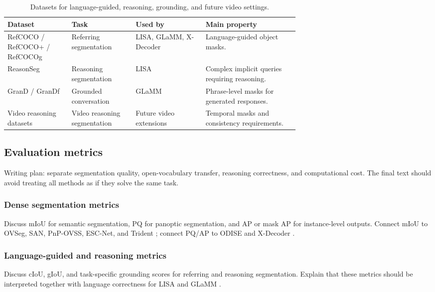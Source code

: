 \begin{table}[t]
\centering
\small
\caption{Datasets for language-guided, reasoning, grounding, and future video settings.}
\label{tab:datasets-grounding}
\begin{tabularx}{\linewidth}{p{0.22\linewidth} p{0.22\linewidth} p{0.24\linewidth} X}
\toprule
Dataset & Task & Used by & Main property \\
\midrule
RefCOCO / RefCOCO+ / RefCOCOg & Referring segmentation & LISA, GLaMM, X-Decoder \citep{lai2024lisa,rasheed2024glamm,zou2023xdecoder} & Language-guided object masks. \\
ReasonSeg & Reasoning segmentation & LISA \citep{lai2024lisa} & Complex implicit queries requiring reasoning. \\
GranD / GranDf & Grounded conversation & GLaMM \citep{rasheed2024glamm} & Phrase-level masks for generated responses. \\
Video reasoning datasets & Video reasoning segmentation & Future video extensions & Temporal masks and consistency requirements. \\
\bottomrule
\end{tabularx}
\end{table}

\subsection{Evaluation metrics}
\label{subsec:evaluation-metrics}
Writing plan: separate segmentation quality, open-vocabulary transfer, reasoning correctness, and computational cost. The final text should avoid treating all methods as if they solve the same task.

\subsubsection{Dense segmentation metrics}
\label{subsubsec:dense-metrics}
Discuss mIoU for semantic segmentation, PQ for panoptic segmentation, and AP or mask AP for instance-level outputs. Connect mIoU to OVSeg, SAN, PnP-OVSS, ESC-Net, and Trident \citep{liang2023ovseg,xu2023san,luo2024pnpovss,lee2025escnet,shi2025trident}; connect PQ/AP to ODISE and X-Decoder \citep{xu2023odise,zou2023xdecoder}.

\subsubsection{Language-guided and reasoning metrics}
\label{subsubsec:reasoning-metrics}
Discuss cIoU, gIoU, and task-specific grounding scores for referring and reasoning segmentation. Explain that these metrics should be interpreted together with language correctness for LISA and GLaMM \citep{lai2024lisa,rasheed2024glamm}.

